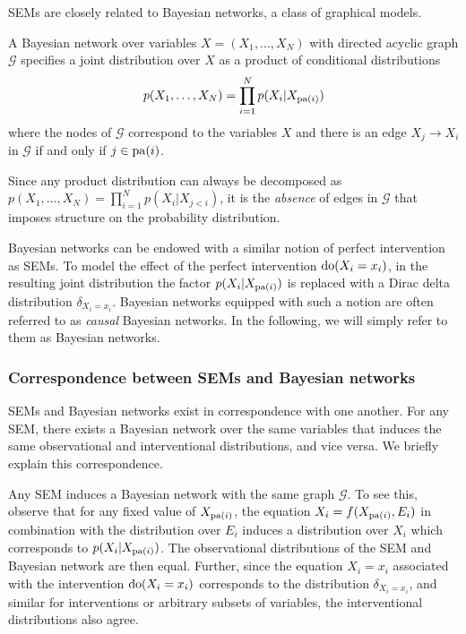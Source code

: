 SEMs are closely related to Bayesian networks, a class of graphical models.

\medskip

\begin{definition}
A Bayesian network over variables $X = (X_1,\ldots, X_N)$ with directed acyclic graph $\mathcal{G}$ specifies a joint distribution over $X$ as a product of conditional distributions
\begin{align*}
	p(X_1,\ldots,X_N) = \prod_{i=1}^N p(X_i | X_{\operatorname{pa}(i)})
\end{align*}
where the nodes of $\mathcal{G}$ correspond to the variables $X$ and there is an edge $X_j \to X_i$ in $\mathcal{G}$ if and only if $j \in \operatorname{pa}(i)$.
\end{definition}

Since any product distribution can always be decomposed as $p(X_1,\ldots,X_N) = \prod_{i=1}^N p(X_i | X_{j<i})$, it is the \emph{absence} of edges in $\mathcal{G}$ that imposes structure on the probability distribution.

Bayesian networks can be endowed with a similar notion of perfect intervention as SEMs. To model the effect of the perfect intervention $\operatorname{do}(X_i = x_i)$, in the resulting joint distribution the factor $p(X_i | X_{\operatorname{pa}(i)})$ is replaced with a Dirac delta distribution $\delta_{X_i = x_i}$. 
Bayesian networks equipped with such a notion are often referred to as \emph{causal} Bayesian networks. 
In the following, we will simply refer to them as Bayesian networks.


\subsubsection{Correspondence between SEMs and Bayesian networks} 
SEMs and Bayesian networks exist in correspondence with one another. 
For any SEM, there exists a Bayesian network over the same variables that induces the same observational and interventional distributions, and vice versa.
We briefly explain this correspondence.

Any SEM induces a Bayesian network with the same graph $\mathcal{G}$.
To see this, observe that for any fixed value of $X_{\operatorname{pa}(i)}$, the equation $X_i = f(X_{\operatorname{pa}(i)} , E_i)$ in combination with the distribution over $E_i$ induces a distribution over $X_i$ which corresponds to $p(X_i | X_{\operatorname{pa}(i)})$. The observational distributions of the SEM and Bayesian network are then equal. Further, since the equation $X_i=x_i$ associated with the intervention $\operatorname{do}(X_i = x_i)$ corresponds to the distribution $\delta_{X_i = x_i}$, and similar for interventions or arbitrary subsets of variables, the interventional distributions also agree.

